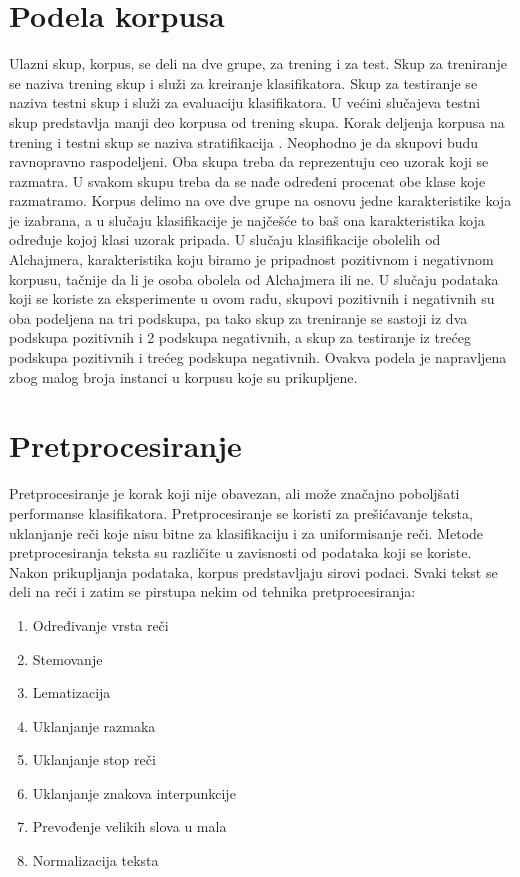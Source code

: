 \documentclass[12pt,oneside]{memoir}
\begin{document}
\section{Podela korpusa}

Ulazni skup, korpus, se deli na dve grupe, za trening i za test. Skup za treniranje se naziva trening skup i služi za kreiranje klasifikatora.  Skup za testiranje se naziva testni skup i služi za evaluaciju klasifikatora. U većini slučajeva testni skup predstavlja manji deo korpusa od trening skupa.  Korak deljenja korpusa na trening i testni skup se naziva stratifikacija \cite{MarijaMR}.   Neophodno je da skupovi budu ravnopravno raspodeljeni.  Oba skupa treba da reprezentuju ceo uzorak koji se razmatra.  U svakom skupu treba da se nađe određeni procenat obe klase koje razmatramo.  Korpus delimo na ove dve grupe na osnovu jedne karakteristike koja je izabrana, a u slučaju klasifikacije je najčešće to baš ona karakteristika koja određuje kojoj klasi uzorak pripada.  U slučaju klasifikacije obolelih od Alchajmera, karakteristika koju biramo je pripadnost pozitivnom i negativnom korpusu, tačnije da li je osoba obolela od Alchajmera ili ne.  
U slučaju podataka koji se koriste za eksperimente u ovom radu,  skupovi pozitivnih i negativnih su oba podeljena na tri podskupa,  pa tako skup za treniranje se sastoji iz dva podskupa pozitivnih i 2 podskupa negativnih,  a skup za testiranje iz trećeg podskupa pozitivnih i trećeg podskupa negativnih.  Ovakva podela je napravljena zbog malog broja instanci u korpusu koje su prikupljene.  

\section{Pretprocesiranje }
 
Pretprocesiranje je korak koji nije obavezan,  ali može značajno poboljšati performanse klasifikatora.  Pretprocesiranje se koristi za  prešićavanje teksta,  uklanjanje reči koje nisu bitne za klasifikaciju i za uniformisanje reči.  Metode pretprocesiranja teksta su različite u zavisnosti od podataka koji se koriste.  Nakon prikupljanja podataka,  korpus predstavljaju sirovi podaci.  Svaki tekst se deli na reči i zatim se pirstupa nekim od tehnika pretprocesiranja:

\begin{enumerate}
\item Određivanje vrsta reči
\item Stemovanje
\item Lematizacija
\item Uklanjanje razmaka
\item Uklanjanje stop reči
\item Uklanjanje znakova interpunkcije
\item Prevođenje velikih slova u mala
\item Normalizacija teksta
\end{enumerate}
\end{document}
